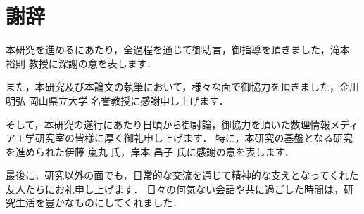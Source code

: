 
\chapter*{謝辞}

本研究を進めるにあたり，全過程を通じて御助言，御指導を頂きました，滝本 裕則 教授に深謝の意を表します．

また，本研究及び本論文の執筆において，様々な面で御協力を頂きました，金川 明弘 岡山県立大学 名誉教授に感謝申し上げます．

そして，本研究の遂行にあたり日頃から御討論，御協力を頂いた数理情報メディア工学研究室の皆様に厚く御礼申し上げます．
特に，本研究の基盤となる研究を進められた伊藤 嵐丸 氏，岸本 昌子 氏に感謝の意を表します．

最後に，研究以外の面でも，日常的な交流を通じて精神的な支えとなってくれた友人たちにお礼申し上げます．
日々の何気ない会話や共に過ごした時間は，研究生活を豊かなものにしてくれました．